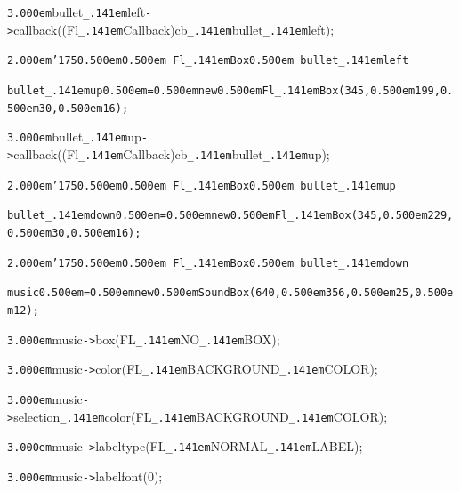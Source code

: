 \documentclass[12pt]{article}
\begin{document}
\noindent
{}{\tt\mc \kern3.000em}bullet{\tt\_\kern.141em}left{\tt -}{\tt >}callback((Fl{\tt\_\kern.141em}Callback{\tt *})cb{\tt\_\kern.141em}bullet{\tt\_\kern.141em}left);

\noindent
{}{\tt\mc \kern2.000em}{\tt\char'175}{\tt\mc \kern0.500em}\tt\mc {\tt /}{\tt /}\kern0.500em Fl{\tt\_\kern.141em}Box{\tt *}\kern0.500em bullet{\tt\_\kern.141em}left

\noindent
\tt{}bullet{\tt\_\kern.141em}up{\tt\mc \kern0.500em}={\tt\mc \kern0.500em}new{\tt\mc \kern0.500em}Fl{\tt\_\kern.141em}Box(345,{\tt\mc \kern0.500em}199,{\tt\mc \kern0.500em}30,{\tt\mc \kern0.500em}16);

\noindent
{}{\tt\mc \kern3.000em}bullet{\tt\_\kern.141em}up{\tt -}{\tt >}callback((Fl{\tt\_\kern.141em}Callback{\tt *})cb{\tt\_\kern.141em}bullet{\tt\_\kern.141em}up);

\noindent
{}{\tt\mc \kern2.000em}{\tt\char'175}{\tt\mc \kern0.500em}\tt\mc {\tt /}{\tt /}\kern0.500em Fl{\tt\_\kern.141em}Box{\tt *}\kern0.500em bullet{\tt\_\kern.141em}up

\noindent
\tt{}bullet{\tt\_\kern.141em}down{\tt\mc \kern0.500em}={\tt\mc \kern0.500em}new{\tt\mc \kern0.500em}Fl{\tt\_\kern.141em}Box(345,{\tt\mc \kern0.500em}229,{\tt\mc \kern0.500em}30,{\tt\mc \kern0.500em}16);

\noindent
{}{\tt\mc \kern2.000em}{\tt\char'175}{\tt\mc \kern0.500em}\tt\mc {\tt /}{\tt /}\kern0.500em Fl{\tt\_\kern.141em}Box{\tt *}\kern0.500em bullet{\tt\_\kern.141em}down

\noindent
\tt{}music{\tt\mc \kern0.500em}={\tt\mc \kern0.500em}new{\tt\mc \kern0.500em}SoundBox(640,{\tt\mc \kern0.500em}356,{\tt\mc \kern0.500em}25,{\tt\mc \kern0.500em}12);

\noindent
{}{\tt\mc \kern3.000em}music{\tt -}{\tt >}box(FL{\tt\_\kern.141em}NO{\tt\_\kern.141em}BOX);

\noindent
{}{\tt\mc \kern3.000em}music{\tt -}{\tt >}color(FL{\tt\_\kern.141em}BACKGROUND{\tt\_\kern.141em}COLOR);

\noindent
{}{\tt\mc \kern3.000em}music{\tt -}{\tt >}selection{\tt\_\kern.141em}color(FL{\tt\_\kern.141em}BACKGROUND{\tt\_\kern.141em}COLOR);

\noindent
{}{\tt\mc \kern3.000em}music{\tt -}{\tt >}labeltype(FL{\tt\_\kern.141em}NORMAL{\tt\_\kern.141em}LABEL);

\noindent
{}{\tt\mc \kern3.000em}music{\tt -}{\tt >}labelfont(0);
\end{document}

